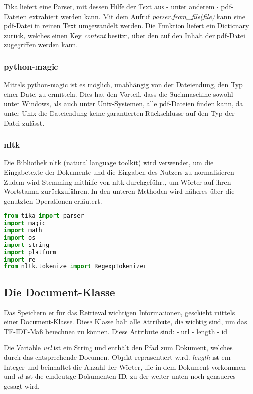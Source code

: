 Tika liefert eine Parser, mit dessen Hilfe der Text aus - unter anderem
- pdf-Dateien extrahiert werden kann. Mit dem Aufruf
\emph{parser.from}\_\emph{file(file)} kann eine pdf-Datei in reinen Text
umgewandelt werden. Die Funktion liefert ein Dictionary zurück, welches
einen Key \emph{content} besitzt, über den auf den Inhalt der pdf-Datei
zugegriffen werden kann.

\subsubsection{python-magic}\label{python-magic}

Mittels python-magic ist es möglich, unabhängig von der Dateiendung, den
Typ einer Datei zu ermitteln. Dies hat den Vorteil, dass die
Suchmaschine sowohl unter Windows, als auch unter Unix-Systemen, alle
pdf-Dateien finden kann, da unter Unix die Dateiendung keine
garantierten Rückschlüsse auf den Typ der Datei zulässt.

\subsubsection{nltk}\label{nltk}

Die Bibliothek nltk (natural language toolkit) wird verwendet, um die
Eingabetexte der Dokumente und die Eingaben des Nutzers zu
normalisieren. Zudem wird Stemming mithilfe von nltk durchgeführt, um
Wörter auf ihren Wortstamm zurückzuführen. In den unteren Methoden wird
näheres über die genutzten Operationen erläutert.

\begin{lstlisting}[language=Python]
from tika import parser
import magic
import math
import os
import string
import platform
import re
from nltk.tokenize import RegexpTokenizer
\end{lstlisting}

\subsection{Die Document-Klasse}\label{die-document-klasse}

Das Speichern er für das Retrieval wichtigen Informationen, geschieht
mittels einer Document-Klasse. Diese Klasse hält alle Attribute, die
wichtig sind, um das TF-IDF-Maß berechnen zu können. Diese Attribute
sind: - url - length - id

Die Variable \emph{url} ist ein String und enthält den Pfad zum
Dokument, welches durch das entsprechende Document-Objekt repräsentiert
wird. \emph{length} ist ein Integer und beinhaltet die Anzahl der
Wörter, die in dem Dokument vorkommen und \emph{id} ist die eindeutige
Dokumenten-ID, zu der weiter unten noch genaueres gesagt wird.

